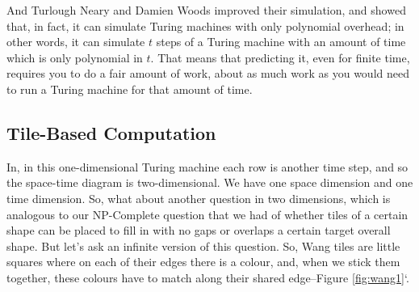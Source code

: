\documentclass[]{article}
\begin{document}
And Turlough Neary and Damien Woods improved their simulation, and showed that, in fact, it can simulate Turing machines with only polynomial overhead\cite{neary2009small}; in other words, it can simulate $t$ steps of a Turing machine with an amount of time which is only polynomial in $t$. That means that predicting it, even for finite time, requires you to do a fair amount of work, about as much work as you would need to run a Turing machine for that amount of time.

\subsection{Tile-Based Computation}

In, in this one-dimensional Turing machine each row is another time step,
and so the space-time diagram is two-dimensional.
We have one space dimension and one time dimension. So, what about another question
in two dimensions, which is analogous to our NP-Complete question that we had of whether
tiles of a certain shape can be placed to fill in with no gaps or overlaps a certain target overall shape. But let's ask an infinite version of this question.
So, Wang tiles are little squares where on each of their edges there is a colour, and, when we stick them together, these colours have to match along their shared edge--Figure \ref{fig:wang1}`.
\end{document}
